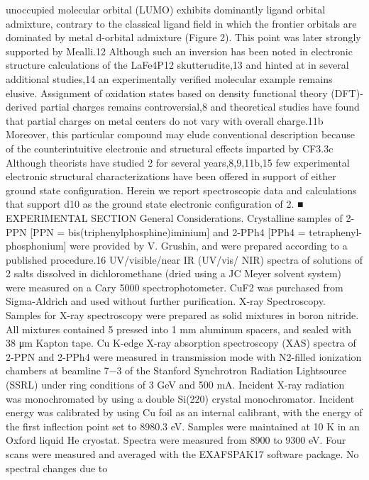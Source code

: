 unoccupied molecular orbital (LUMO) exhibits dominantly
ligand orbital admixture, contrary to the classical ligand ﬁeld in
which the frontier orbitals are dominated by metal d-orbital
admixture (Figure 2). This point was later strongly supported
by Mealli.12 Although such an inversion has been noted in
electronic structure calculations of the LaFe4P12 skutterudite,13
and hinted at in several additional studies,14 an experimentally
veriﬁed molecular example remains elusive.
Assignment of oxidation states based on density functional
theory (DFT)-derived partial charges remains controversial,8
and theoretical studies have found that partial charges on metal
centers do not vary with overall charge.11b Moreover, this
particular compound may elude conventional description
because of the counterintuitive electronic and structural eﬀects
imparted by CF3.3c Although theorists have studied 2 for
several years,8,9,11b,15 few experimental electronic structural
characterizations have been oﬀered in support of either ground
state conﬁguration. Herein we report spectroscopic data and
calculations that support d10 as the ground state electronic
conﬁguration of 2.
■ EXPERIMENTAL SECTION
General Considerations. Crystalline samples of 2-PPN [PPN =
bis(triphenylphosphine)iminium] and 2-PPh4 [PPh4 = tetraphenyl-
phosphonium] were provided by V. Grushin, and were prepared
according to a published procedure.16 UV/visible/near IR (UV/vis/
NIR) spectra of solutions of 2 salts dissolved in dichloromethane
(dried using a JC Meyer solvent system) were measured on a Cary
5000 spectrophotometer. CuF2 was purchased from Sigma-Aldrich and
used without further puriﬁcation.
X-ray Spectroscopy. Samples for X-ray spectroscopy were
prepared as solid mixtures in boron nitride. All mixtures contained
5%
pressed into 1 mm aluminum spacers, and sealed with 38 μm Kapton
tape.
Cu K-edge X-ray absorption spectroscopy (XAS) spectra of 2-PPN
and 2-PPh4 were measured in transmission mode with N2-ﬁlled
ionization chambers at beamline 7−3 of the Stanford Synchrotron
Radiation Lightsource (SSRL) under ring conditions of 3 GeV and
500 mA. Incident X-ray radiation was monochromated by using a
double Si(220) crystal monochromator. Incident energy was calibrated
by using Cu foil as an internal calibrant, with the energy of the ﬁrst
inﬂection point set to 8980.3 eV. Samples were maintained at 10 K in
an Oxford liquid He cryostat. Spectra were measured from 8900 to
9300 eV. Four scans were measured and averaged with the
EXAFSPAK17 software package. No spectral changes due to
